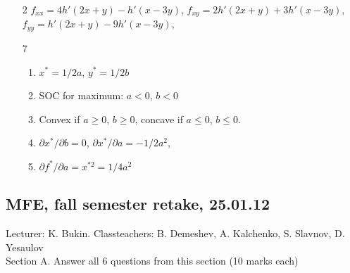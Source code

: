 \begin{enumerate}
\item[2]
$f_{xx}=4h'(2x+y)-h'(x-3y)$,
$f_{xy}=2h'(2x+y)+3h'(x-3y)$,
$f_{yy}=h'(2x+y)-9h'(x-3y)$,


\item[7]
\begin{enumerate}
\item $x^*=1/2a$, $y^*=1/2b$
\item SOC for maximum: $a<0$, $b<0$
\item Convex if $a\geq 0$, $b\geq 0$, concave if $a \leq 0$, $b \leq 0$.
\item $\partial x^*/\partial b=0$, $\partial x^*/\partial a=-1/2a^2$,
\item  $\partial f^*/\partial a= x^{*2}=1/4a^2$
\end{enumerate}
\end{enumerate}

\subsection{MFE, fall semester retake, 25.01.12 }

Lecturer: K. Bukin. Classteachers: B. Demeshev, A. Kalchenko, S. Slavnov, D. Yesaulov \\

Section A. Answer all 6 questions from this section (10 marks each)

